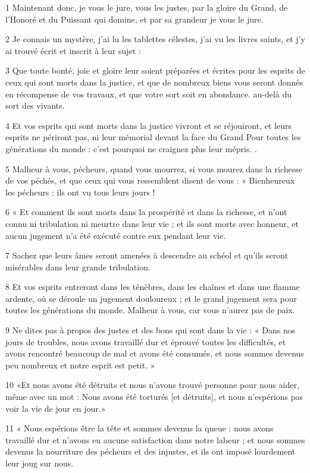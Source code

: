 \par 1 Maintenant donc, je vous le jure, vous les justes, par la gloire du Grand, de l'Honoré et du Puissant qui domine, et par sa grandeur je vous le jure.
\par 2 Je connais un mystère, j'ai lu les tablettes célestes, j'ai vu les livres saints, et j'y ai trouvé écrit et inscrit à leur sujet :
\par 3 Que toute bonté, joie et gloire leur soient préparées et écrites pour les esprits de ceux qui sont morts dans la justice, et que de nombreux biens vous seront donnés en récompense de vos travaux, et que votre sort soit en abondance. au-delà du sort des vivants.
\par 4 Et vos esprits qui sont morts dans la justice vivront et se réjouiront, et leurs esprits ne périront pas, ni leur mémorial devant la face du Grand Pour toutes les générations du monde : c'est pourquoi ne craignez plus leur mépris. .
\par 5 Malheur à vous, pécheurs, quand vous mourrez, si vous mourez dans la richesse de vos péchés, et que ceux qui vous ressemblent disent de vous : « Bienheureux les pécheurs : ils ont vu tous leurs jours !
\par 6 « Et comment ils sont morts dans la prospérité et dans la richesse, et n'ont connu ni tribulation ni meurtre dans leur vie ; et ils sont morts avec honneur, et aucun jugement n'a été exécuté contre eux pendant leur vie.
\par 7 Sachez que leurs âmes seront amenées à descendre au schéol et qu'ils seront misérables dans leur grande tribulation.
\par 8 Et vos esprits entreront dans les ténèbres, dans les chaînes et dans une flamme ardente, où se déroule un jugement douloureux ; et le grand jugement sera pour toutes les générations du monde. Malheur à vous, car vous n'aurez pas de paix.
\par 9 Ne dites pas à propos des justes et des bons qui sont dans la vie : « Dans nos jours de troubles, nous avons travaillé dur et éprouvé toutes les difficultés, et avons rencontré beaucoup de mal et avons été consumés, et nous sommes devenus peu nombreux et notre esprit est petit. »
\par 10 «Et nous avons été détruits et nous n'avons trouvé personne pour nous aider, même avec un mot : Nous avons été torturés [et détruits], et nous n'espérions pas voir la vie de jour en jour.»
\par 11 « Nous espérions être la tête et sommes devenus la queue : nous avons travaillé dur et n'avons eu aucune satisfaction dans notre labeur ; et nous sommes devenus la nourriture des pécheurs et des injustes, et ils ont imposé lourdement leur joug sur nous.
